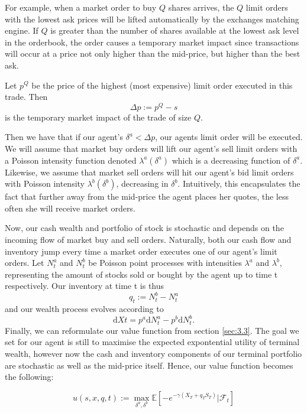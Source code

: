 For example, when a market order to buy $Q$ shares arrives, the $Q$ 
limit orders with the lowest ask prices will be lifted automatically
by the exchanges matching engine. If $Q$ is greater than the number
of shares available at the lowest ask level in the orderbook, the order
causes a temporary market impact since transactions will occur at a 
price not only higher than the mid-price, but higher than the best ask.

\begin{definition}
    Let $p^Q$ be the price of the highest (most expensive) limit order 
    executed in this trade. Then 
    \begin{equation}
        \Delta p:=p^Q-s
    \end{equation}
    is the temporary market impact of the trade of size $Q.$ 
\end{definition}

Then we have that if our agent's $\delta^a < \Delta p$, our agents 
limit order will be executed. We will assume that market buy orders
will lift our agent's sell limit orders with a Poisson intensity function
denoted $\lambda^a(\delta^a)$ which is a decreasing function of $\delta^a$.
Likewise, we assume that market sell orders will hit our agent's bid 
limit orders with Poisson intensity $\lambda^b(\delta^b)$, decreasing
in $\delta^b$. Intuitively, this encapsulates the fact that further 
away from the mid-price the agent places her quotes, the less often she
will receive market orders.

Now, our cash wealth and portfolio of stock is stochastic and depends
on the incoming flow of market buy and sell orders. Naturally, both
our cash flow and inventory jump every time a market order executes 
one of our agent's limit orders. Let $N^a_t$ and $N^b_t$ be Poisson 
point processes with intensities $\lambda^a$ and $\lambda^b$, 
representing the amount of stocks sold or bought by the agent up to 
time t respectively. Our inventory at time t is thus 
\begin{equation}
    q_t:=N^b_t-N^a_t
\end{equation} 
and our wealth process evolves according to
\begin{equation}
    \mathrm dXt=p^a\mathrm dN^a_t-p^b\mathrm dN^b_t.
\end{equation}
Finally, we can reformulate our value function from section \ref{sec:3.3}.
The goal we set for our agent is still to maximise the expected 
expontential utility of terminal wealth, however now the cash and 
inventory components of our terminal portfolio are stochastic as 
well as the mid-price itself. Hence, our value function becomes 
the following:
\begin{definition}
    \begin{equation}\label{eq:3.12}
        u(s,x,q,t):=\max\limits_{\delta^a,\delta^b}\mathbb{E}\left[-e^{-\gamma(X_T+q_TS_T)}|\mathcal{F}_t\right]
    \end{equation}
\end{definition}

